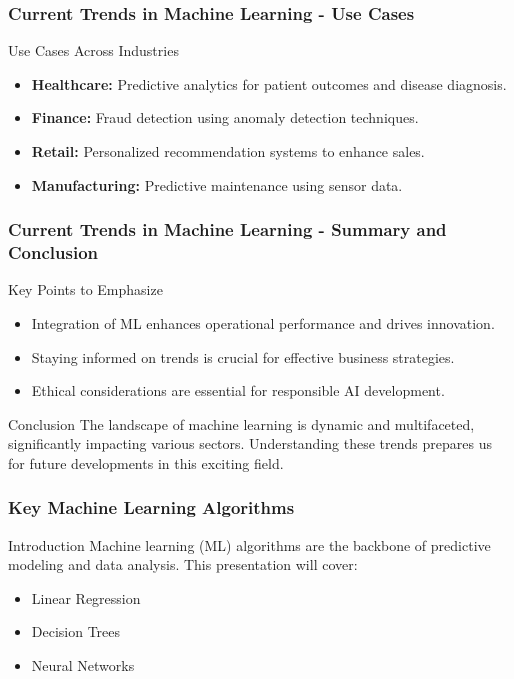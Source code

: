 \documentclass[aspectratio=169]{beamer}
\begin{document}
\begin{frame}[fragile]
    \frametitle{Current Trends in Machine Learning - Use Cases}
    \begin{block}{Use Cases Across Industries}
        \begin{itemize}
            \item \textbf{Healthcare:} Predictive analytics for patient outcomes and disease diagnosis.
            \item \textbf{Finance:} Fraud detection using anomaly detection techniques.
            \item \textbf{Retail:} Personalized recommendation systems to enhance sales.
            \item \textbf{Manufacturing:} Predictive maintenance using sensor data.
        \end{itemize}
    \end{block}
\end{frame}

\begin{frame}[fragile]
    \frametitle{Current Trends in Machine Learning - Summary and Conclusion}
    \begin{block}{Key Points to Emphasize}
        \begin{itemize}
            \item Integration of ML enhances operational performance and drives innovation.
            \item Staying informed on trends is crucial for effective business strategies.
            \item Ethical considerations are essential for responsible AI development.
        \end{itemize}
    \end{block}
    
    \begin{block}{Conclusion}
        The landscape of machine learning is dynamic and multifaceted, significantly impacting various sectors. Understanding these trends prepares us for future developments in this exciting field.
    \end{block}
\end{frame}

\begin{frame}
    \frametitle{Key Machine Learning Algorithms}
    \begin{block}{Introduction}
        Machine learning (ML) algorithms are the backbone of predictive modeling and data analysis. This presentation will cover:
        \begin{itemize}
            \item Linear Regression
            \item Decision Trees
            \item Neural Networks
        \end{itemize}
    \end{block}
\end{frame}
\end{document}

